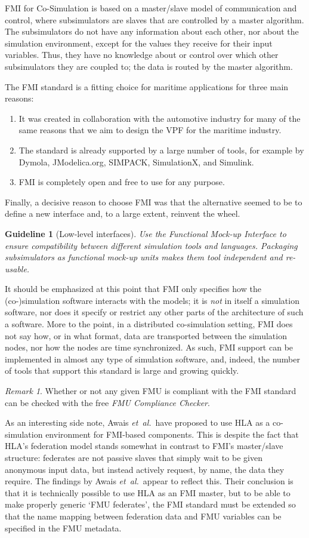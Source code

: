 \documentclass[prb,aps,showpacs,floatfix,twocolumn,10pt]{revtex4-1}
\newcommand{\sub}{subsimulator}
\newcommand{\guidelineFMI}{%
	Use the Functional Mock-up Interface to ensure compatibility between different simulation tools and languages.
	Packaging \sub{}s as functional mock-up units makes them tool independent and re-usable.
}
\theoremstyle{plain}
\newtheorem{guideline}{Guideline}
\theoremstyle{remark}
\newtheorem{remark}{Remark}[guideline]
\begin{document}
FMI for Co-Simulation is based on a master/slave model of communication and control, where \sub{}s are slaves that are controlled by a master algorithm.
The \sub{}s do not have any information about each other, nor about the simulation environment, except for the values they receive for their input variables.
Thus, they have no knowledge about or control over which other \sub{}s they are coupled to; the data is routed by the master algorithm.

The FMI standard is a fitting choice for maritime applications for three main reasons:
\begin{enumerate}
	\item It was created in collaboration with the automotive industry for many of the same reasons that we aim to design the VPF for the maritime industry.
	\item The standard is already supported by a large number of tools, for example by Dymola, JModelica.org, SIMPACK, SimulationX, and Simulink.
	\item FMI is completely open and free to use for any purpose.
\end{enumerate}
Finally, a decisive reason to choose FMI was that the alternative seemed to be to define a new interface and, to a large extent, reinvent the wheel.

\begin{guideline}[Low-level interfaces]
\label{guideline:FMI}
	\guidelineFMI{}
\end{guideline}

It should be emphasized at this point that FMI only specifies how the (co-)simulation software interacts with the models; it is \emph{not} in itself a simulation software, nor does it specify or restrict any other parts of the architecture of such a software.
More to the point, in a distributed co-simulation setting, FMI does not say how, or in what format, data are transported between the simulation nodes, nor how the nodes are time synchronized.
As such, FMI support can be implemented in almost any type of simulation software, and, indeed, the number of tools that support this standard is large and growing quickly.\cite{FMI-website}

\begin{remark}
	Whether or not any given FMU is compliant with the FMI standard can be checked with the free \emph{FMU Compliance Checker}.\cite{FMI-website}
\end{remark}

As an interesting side note, Awais \emph{et~al.}\ have proposed to use HLA as a co-simulation environment for FMI-based components.\cite{Awais2013}
This is despite the fact that HLA's federation model stands somewhat in contrast to FMI's master/slave structure:
federates are not passive slaves that simply wait to be given anonymous input data, but instead actively request, by name, the data they require.
The findings by Awais \emph{et~al.}\ appear to reflect this.
Their conclusion is that it is technically possible to use HLA as an FMI master, but to be able to make properly generic `FMU federates', the FMI standard must be extended so that the name mapping between federation data and FMU variables can be specified in the FMU metadata.
\end{document}
